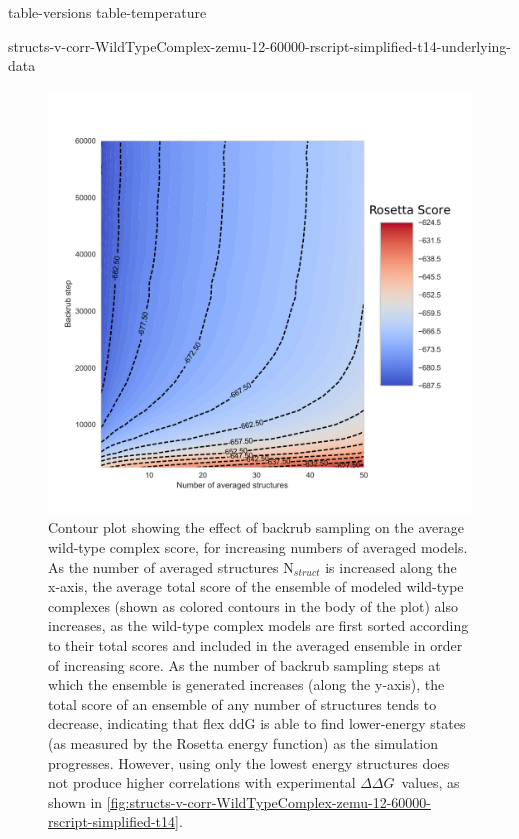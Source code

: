 \documentclass[journal=jpcbfk,manuscript=suppinfo]{achemso}
\newcommand\ddg{$\Delta\Delta G$}
\begin{document}
\renewcommand{\thefigure}{S\arabic{figure}}
\setcounter{figure}{0}
\renewcommand{\thetable}{S\arabic{table}}
\setcounter{table}{0}
\renewcommand*{\thepage}{S\arabic{page}}

{table-versions}
{table-temperature}
\clearpage

\clearpage

\begin{landscape}
  {\small
    {structs-v-corr-WildTypeComplex-zemu-12-60000-rscript-simplified-t14-underlying-data}
  }
\end{landscape}
\clearpage

\begin{figure}
  \centering
  \includegraphics[width=\textwidth,keepaspectratio]{figures/wildtypecomplex-scores-complete.pdf}
  \caption{
    Contour plot showing the effect of backrub sampling on the average wild-type complex score, for increasing numbers of averaged models. As the number of averaged structures N$_{struct}$ is increased along the x-axis, the average total score of the ensemble of modeled wild-type complexes (shown as colored contours in the body of the plot) also increases, as the wild-type complex models are first sorted according to their total scores and included in the averaged ensemble in order of increasing score.
    As the number of backrub sampling steps at which the ensemble is generated increases (along the y-axis), the total score of an ensemble of any number of structures tends to decrease, indicating that flex ddG is able to find lower-energy states (as measured by the Rosetta energy function) as the simulation progresses. However, using only the lowest energy structures does not produce higher correlations with experimental \ddg\ values, as shown in \cref{fig:structs-v-corr-WildTypeComplex-zemu-12-60000-rscript-simplified-t14}.
  } \label{fig:wildtypecomplex-scores-complete}
\end{figure}
\end{document}
